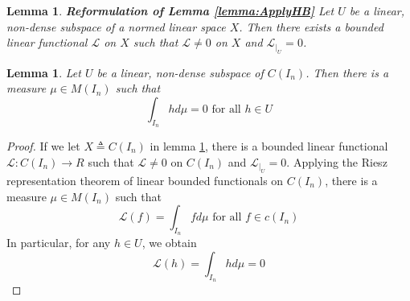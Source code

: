 \documentclass[12pt]{amsart}
\theoremstyle{plain}
\newtheorem{lemma}[thm]{Lemma}
\theoremstyle{definition}
\theoremstyle{remark}
\numberwithin{equation}{section}
\numberwithin{thm}{section}
\begin{document}
\begin{lemma} \label{lemma:ApplyHB2}
  \textbf{Reformulation of Lemma \ref{lemma:ApplyHB}}
  Let $U$ be a linear, non-dense subspace of a normed linear space $X$. Then there exists a bounded linear functional $\mathcal{L}$ on $X$ such that $\mathcal{L} \neq 0$ on $X$ and $\mathcal{L}_|_U = 0$.
\end{lemma}

\begin{lemma} \label{lemma:nondense}
    Let $U$ be a linear, non-dense subspace of $C(I_n)$. Then there is a measure $\mu \in M(I_n)$ such that 
    \begin{equation*}
        \int_{I_n} h d\mu = 0 \text{ for all } h \in U 
    \end{equation*}
\end{lemma}
\begin{proof}
    If we let $X\triangleq C(I_n)$ in lemma \ref{lemma:ApplyHB2}, there is a bounded linear functional $\mathcal{L}: C(I_n) \to R$ such that $\mathcal{L} \neq 0$ on $C(I_n)$ and $\mathcal{L}_|_U=0$. Applying the Riesz representation theorem of linear bounded functionals on $C(I_n)$, there is a measure $\mu \in M(I_n)$ such that 
    \begin{equation}
        \mathcal{L}(f) = \int_{I_n} f d \mu \text{ for all } f \in c(I_n)
    \end{equation}
    In particular, for any $h \in U$, we obtain 
    \begin{equation}
        \mathcal{L}(h) = \int_{I_n} h d\mu = 0
    \end{equation}
\end{proof}
\end{document}
